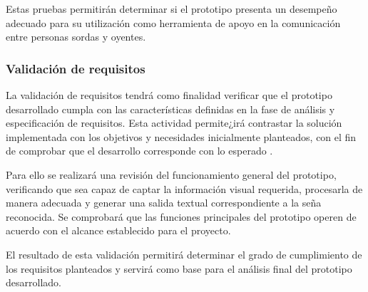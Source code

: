 	Estas pruebas permitirán determinar si el prototipo presenta un desempeño
	adecuado para su utilización como herramienta de apoyo en la comunicación entre personas sordas y oyentes.
	
	\subsubsection{Validación de requisitos}
	
	La validación de requisitos tendrá como finalidad verificar que el prototipo
	desarrollado cumpla con las características definidas en la fase
	de análisis y especificación de requisitos. Esta
	actividad permite¿irá contrastar la solución implementada con los objetivos y
	necesidades inicialmente planteados, con el fin de comprobar que el 
	desarrollo corresponde con lo esperado \cite{pressman2014,mall2018}.
	
	Para ello se realizará una revisión del funcionamiento general del prototipo,
	verificando que sea capaz de captar la información visual requerida,
	procesarla de manera adecuada y generar una salida textual correspondiente a
	la seña reconocida. Se comprobará que las funciones principales del
	prototipo operen de acuerdo con el alcance establecido para el proyecto.
	
	El resultado de esta validación permitirá determinar el grado de cumplimiento
	de los requisitos planteados y servirá como base para el análisis final del
	prototipo desarrollado.
	\newpage
	
